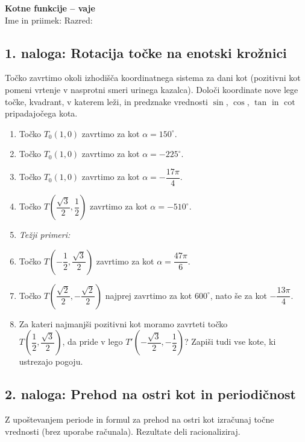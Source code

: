 \documentclass[11pt,a4paper]{article}
\newcommand{\naloga}[1]{\subsection*{#1}}
\begin{document}
\begin{center}
  {\Large\bfseries Kotne funkcije -- vaje}\\[4pt]
  Ime in priimek: \underline{\hspace{6cm}} \quad Razred: \underline{\hspace{2cm}}
\end{center}

\naloga{1. naloga: Rotacija točke na enotski krožnici}

Točko zavrtimo okoli izhodišča koordinatnega sistema za dani kot (pozitivni kot pomeni vrtenje
v nasprotni smeri urinega kazalca). Določi koordinate nove lege točke, kvadrant, v katerem leži,
in predznake vrednosti $\sin$, $\cos$, $\tan$ in $\cot$ pripadajočega kota.

\begin{enumerate}[label=\alph*), itemsep=6pt]
  \item Točko $T_0(1,0)$ zavrtimo za kot $\alpha = 150^\circ$.
  \item Točko $T_0(1,0)$ zavrtimo za kot $\alpha = -225^\circ$.
  \item Točko $T_0(1,0)$ zavrtimo za kot $\alpha = -\dfrac{17\pi}{4}$.
  \item Točko $T\!\left(\dfrac{\sqrt{3}}{2}, \dfrac{1}{2}\right)$ zavrtimo za kot $\alpha = -510^\circ$.
  \item[] \textit{Težji primeri:}
  \item Točko $T\!\left(-\dfrac{1}{2}, \dfrac{\sqrt{3}}{2}\right)$ zavrtimo za kot $\alpha = \dfrac{47\pi}{6}$.
  \item Točko $T\!\left(\dfrac{\sqrt{2}}{2}, -\dfrac{\sqrt{2}}{2}\right)$ najprej zavrtimo za kot $600^\circ$, nato še za kot $-\dfrac{13\pi}{4}$.
  \item Za kateri najmanjši pozitivni kot moramo zavrteti točko\\ $T\!\left(\dfrac{1}{2}, \dfrac{\sqrt{3}}{2}\right)$,
        da pride v lego $T'\!\left(-\dfrac{\sqrt{3}}{2}, -\dfrac{1}{2}\right)$? Zapiši tudi vse kote, ki ustrezajo pogoju.
\end{enumerate}

\naloga{2. naloga: Prehod na ostri kot in periodičnost}

Z upoštevanjem periode in formul za prehod na ostri kot izračunaj točne vrednosti
(brez uporabe računala). Rezultate deli racionaliziraj.
\end{document}
